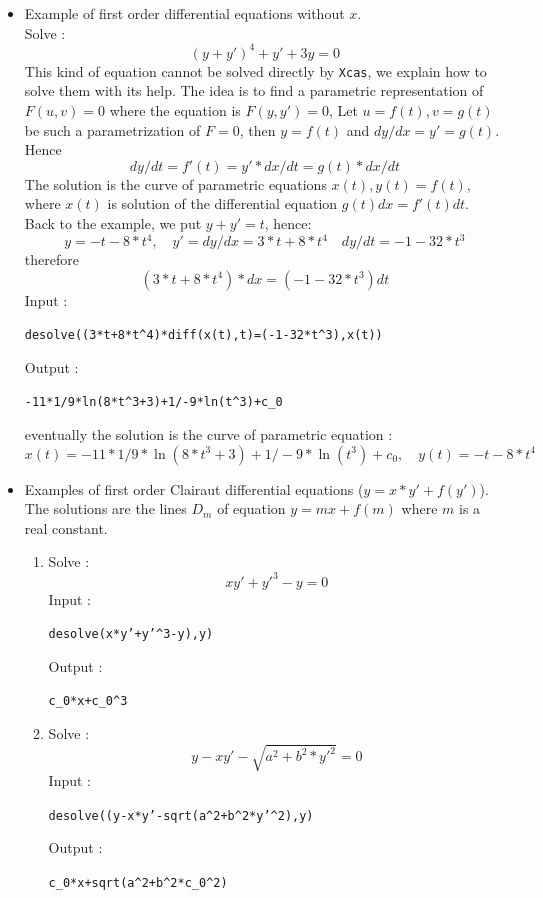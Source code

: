 \documentclass[a4paper,11pt]{book}
\begin{document}
\begin{itemize}
\item Example of first order differential equations without $x$.\\
Solve :
$$(y+y')^4+y'+3y=0$$
This kind of equation cannot be solved directly by {\tt Xcas}, we explain
how to solve them with its help. 
The idea is to find a parametric representation of 
$F(u,v)=0$ where the equation is $F(y,y')=0$, 
Let $u=f(t),v=g(t)$ be such a parametrization of $F=0$, then 
$y=f(t)$ and $dy/dx=y'=g(t)$. Hence
\[ dy/dt=f'(t)=y'*dx/dt=g(t)*dx/dt \]
The solution is the curve of parametric equations
$x(t), y(t)=f(t)$, where $x(t)$ is solution of the differential equation 
 $g(t)dx=f'(t)dt$.\\
Back to the example, we put $y+y'=t$, hence:
\[ y=-t-8*t^4, \quad y'=dy/dx=3*t+8*t^4 \quad dy/dt=-1-32*t^3
\] 
therefore
\[ (3*t+8*t^4)*dx=(-1-32*t^3)dt \]
Input :
\begin{center}{\tt desolve((3*t+8*t\verb|^|4)*diff(x(t),t)=(-1-32*t\verb|^|3),x(t))}\end{center}
Output :
\begin{center}{\tt -11*1/9*ln(8*t\verb|^|3+3)+1/-9*ln(t\verb|^|3)+c\_0}\end{center}
eventually the solution is the curve of parametric equation :
\[ x(t)=-11*1/9*\ln(8*t^3+3)+1/-9*\ln(t^3)+c_0,
\quad y(t)=-t-8*t^4 \]

\item Examples of first order 
Clairaut differential equations ($y=x*y'+f(y')$).\\
The solutions are the lines $D_m$ of equation $y=mx+f(m)$ where
 $m$ is a real constant.
\begin{enumerate}
\item Solve :
$$xy'+y'^3-y=0$$
Input :
\begin{center}{\tt desolve(x*y'+y'\verb|^|3-y),y)}\end{center}
Output  :
\begin{center}{\tt c\_0*x+c\_0\verb|^|3}\end{center}
\item 
Solve :
$$y-xy' - \sqrt{a^2+b^2*y'^2}=0$$
Input :
\begin{center}{\tt desolve((y-x*y'-sqrt(a\verb|^|2+b\verb|^|2*y'\verb|^|2),y)}\end{center}
Output  :
\begin{center}{\tt c\_0*x+sqrt(a\verb|^|2+b\verb|^|2*c\_0\verb|^|2)}\end{center}
\end{enumerate}
\end{itemize}
\end{document}
